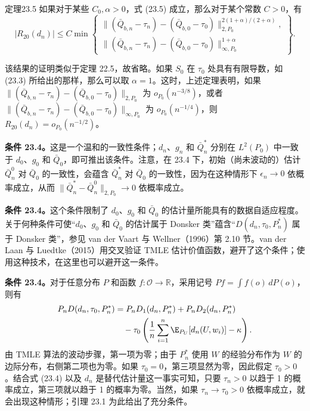 \begin{bookresult}{定理}{23.5}
如果对于某些 $C_0,\alpha>0$，式 (23.5) 成立，那么对于某个常数 $C>0$，有
\[
 |R_{20}(d_n)|\leq C\min\left\{
 \begin{gathered}
 \bigl\|(\bar Q_{b,n}-\tau_n)-(\bar Q_{b,0}-\tau_0)\bigr\|_{2,P_0}^{2(1+\alpha)/(2+\alpha)},\\
 \bigl\|(\bar Q_{b,n}-\tau_n)-(\bar Q_{b,0}-\tau_0)\bigr\|_{\infty,P_0}^{1+\alpha}
 \end{gathered}\right\}.
\]
\end{bookresult}

该结果的证明类似于定理 22.5，故省略。如果 $S_0$ 在 $\tau_0$ 处具有有限导数，如 (23.3) 所给出的那样，那么可以取 $\alpha=1$。这时，上述定理表明，如果
$\bigl\|(\bar Q_{b,n}-\tau_n)-(\bar Q_{b,0}-\tau_0)\bigr\|_{2,P_0}$
为 $o_{P_0}(n^{-3/8})$，或者
$\bigl\|(\bar Q_{b,n}-\tau_n)-(\bar Q_{b,0}-\tau_0)\bigr\|_{\infty,P_0}$
为 $o_{P_0}(n^{-1/4})$，则 $R_{20}(d_n)=o_{P_0}(n^{-1/2})$。

\noindent\textbf{条件 23.4。}这是一个温和的一致性条件；$d_n$、$g_n$ 和 $\bar Q_n^*$ 分别在 $L^2(P_0)$ 中一致于 $d_0$、$g_0$ 和 $\bar Q_0$，即可推出该条件。注意，在 23.4 下，初始（尚未波动的）估计 $\bar Q_n^0$ 对 $\bar Q_0$ 的一致性，会蕴含 $\bar Q_n^*$ 对 $\bar Q_0$ 的一致性，因为在这种情形下 $\epsilon_n\to0$ 依概率成立，从而 $\|\bar Q_n^*-\bar Q_n^0\|_{2,P_0}\to0$ 依概率成立。

\noindent\textbf{条件 23.4。}这个条件限制了 $d_0$、$g_0$ 和 $\bar Q_0$ 的估计量所能具有的数据自适应程度。关于何种条件可使“$d_0$、$g_0$ 和 $\bar Q_0$ 的估计属于 Donsker 类”蕴含“$D(d_n,\tau_0,P_n^*)$ 属于 Donsker 类”，参见 van der Vaart 与 Wellner（1996）第 2.10 节。van der Laan 与 Luedtke（2015）用交叉验证 TMLE 估计价值函数，避开了这个条件；使用这种技术，在这里也可以避开这一条件。

\noindent\textbf{条件 23.4。}对于任意分布 $P$ 和函数 $f:\mathcal O\to\mathbb R$，采用记号 $Pf=\int f(o)\,dP(o)$，则有
\[
\begin{aligned}
 P_nD(d_n,\tau_0,P_n^*)&=P_nD_1(d_n,P_n^*)+P_nD_2(d_n,P_n^*)\\
 &\quad-\tau_0\left(\frac1n\sum_{i=1}^n\E_{P_U}[d_n(U,w_i)]-\kappa\right).
\end{aligned}
\]
由 TMLE 算法的波动步骤，第一项为零；由于 $P_n^*$ 使用 $W$ 的经验分布作为 $W$ 的边际分布，右侧第二项也为零。如果 $\tau_0=0$，第三项显然为零，因此假定 $\tau_0>0$。结合式 (23.4) 以及 $d_n$ 是替代估计量这一事实可知，只要 $\tau_n>0$ 以趋于 1 的概率成立，第三项就以趋于 1 的概率为零。当然，如果 $\tau_n\to\tau_0>0$ 依概率成立，就会出现这种情形；引理 23.1 为此给出了充分条件。
